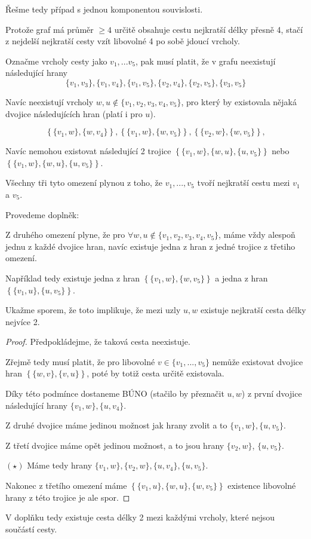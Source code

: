 \documentclass[../main.tex]{subfiles}
\begin{document}
Řešme tedy případ s jednou komponentou souvislosti.

Protože graf má průměr $\geq4$ určitě obsahuje cestu nejkratší délky přesně 4, stačí z nejdelší nejkratší cesty vzít libovolné 4 po sobě jdoucí vrcholy.

Označme vrcholy cesty jako $v_1, ... v_5$, pak musí platit, že v grafu neexistují následující hrany
\begin{equation*}
    \{v_1,v_3\},\{v_1,v_4\},\{v_1,v_5\},\{v_2,v_4\},\{v_2,v_5\},\{v_3,v_5\}
\end{equation*}

Navíc neexistují vrcholy $w,u\notin\{v_1,v_2,v_3,v_4,v_5\}$, pro který by existovala nějaká dvojice následujících hran (platí i pro $u$).

\begin{equation*}    
\left\{\{v_1, w\}, \{w, v_4\}\right\},
\left\{\{v_1, w\}, \{w, v_5\}\right\},
\left\{\{v_2, w\}, \{w, v_5\}\right\},
\end{equation*}

Navíc nemohou existovat následující 2 trojice $\left\{\{v_1, w\}, \{w,u\}, \{u, v_5\}\right\}$ nebo $\left\{\{v_1, w\}, \{w,u\}, \{u, v_5\}\right\}$.

Všechny tři tyto omezení plynou z toho, že $v_1,...,v_5$ tvoří nejkratší cestu mezi $v_1$ a $v_5$.

Provedeme  doplněk:

Z druhého omezení plyne, že pro $\forall w,u \notin \{v_1,v_2,v_3,v_4,v_5\}$,
máme vždy alespoň jednu z každé dvojice hran, navíc existuje jedna z hran z jedné trojice z třetiho omezení. 

Například tedy existuje  jedna z hran $\left\{\{v_1, w\}, \{w, v_5\}\right\}$ a 
jedna z hran $\left\{\{v_1, u\}, \{u, v_5\}\right\}$. 

Ukažme sporem, že toto implikuje, že mezi uzly $u,w$ existuje 
nejkratší cesta délky nejvíce 2.

\begin{proof}
    Předpokládejme, že taková cesta neexistuje.

    Zřejmě tedy musí platit, že pro libovolné $v\in\{v_1,...,v_5\}$ nemůže existovat dvojice hran $\left\{\{w,v\},\{v,u\}\right\}$, poté by totiž cesta určitě existovala.

    Díky této podmínce dostaneme BÚNO (stačilo by přeznačit $u,w$) 
    z první dvojice následující hrany $\{v_1, w\}, \{u, v_4\}$.

    Z druhé dvojice máme jedinou možnost jak hrany zvolit a to $\{v_1, w\}, \{u, v_5\}$.

    Z třetí dvojice máme opět jedinou možnost, a to jsou  hrany $\{v_2, w\}$, $\{u, v_5\}$.

    $(\star)$ Máme tedy hrany $\{v_1, w\}, \{v_2, w\}, \{u, v_4\}, \{u, v_5\}$. 

    Nakonec z třetího omezení máme $\left\{\{v_1, u\}, \{w,u\}, \{w, v_5\}\right\}$
    existence libovolné hrany z této trojice je ale spor.
     
\end{proof}
V doplňku tedy existuje cesta délky 2 mezi každými vrcholy, které nejsou součástí cesty.
\end{document}
